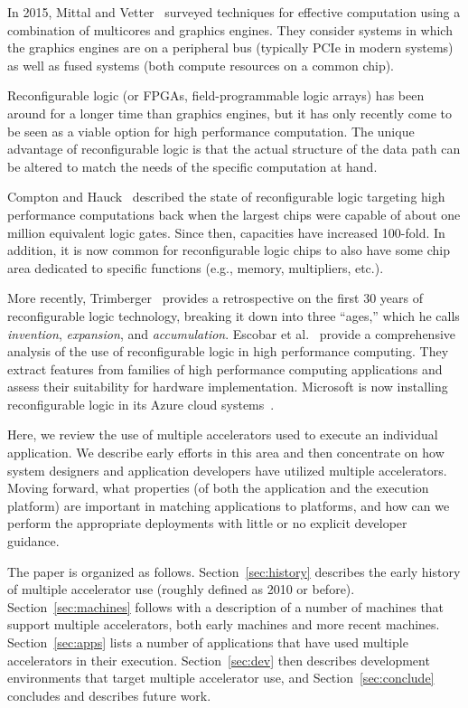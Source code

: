 In 2015, Mittal and Vetter~\cite{mv15} surveyed techniques for effective
computation using a combination of multicores and graphics engines. They
consider systems in which the graphics engines are on a peripheral bus
(typically PCIe in modern systems) as well as fused systems (both compute
resources on a common chip).

Reconfigurable logic (or FPGAs, field-programmable logic arrays) has been
around for a longer time than graphics engines, but it has only recently come
to be seen as a viable option for high performance computation.
The unique advantage of reconfigurable logic is that the actual 
structure of the data path can be altered to match the needs of the specific
computation at hand.

Compton and Hauck~\cite{ch02} described the state of reconfigurable logic
targeting high performance computations back when the largest chips were
capable of about one million equivalent logic gates.  Since then, capacities
have increased 100-fold.  In addition, it is now common for reconfigurable
logic chips to also have some chip area dedicated to specific functions (e.g.,
memory, multipliers, etc.).

More recently, Trimberger~\cite{Trimberger15} provides a retrospective on
the first 30 years of reconfigurable logic technology, breaking it down into
three ``ages,'' which he calls \emph{invention}, \emph{expansion}, and
\emph{accumulation}.  Escobar et al.~\cite{ecv16} provide a comprehensive
analysis of the use of reconfigurable logic in high performance computing.
They extract features from families of high performance computing
applications and assess their suitability for hardware implementation.
Microsoft is now installing reconfigurable logic in its Azure cloud
systems~\cite{ccp+16}.

Here, we review the use of multiple accelerators used to execute an individual
application. We describe early efforts in this area and then concentrate on
how system designers and application developers have utilized multiple
accelerators.  Moving forward, what properties (of both the application and
the execution platform) are important in matching applications to platforms,
and how can we perform the appropriate deployments with little or no
explicit developer guidance.

The paper is organized as follows.  Section~\ref{sec:history} describes
the early history of multiple accelerator use (roughly defined as 2010
or before).  Section~\ref{sec:machines}
follows with a description of a number of machines that support multiple
accelerators, both early machines and more recent machines.
Section~\ref{sec:apps} lists a number of applications that have used
multiple accelerators in their execution.
Section~\ref{sec:dev} then describes development
environments that target multiple accelerator use, and
Section~\ref{sec:conclude} concludes and describes future work.
